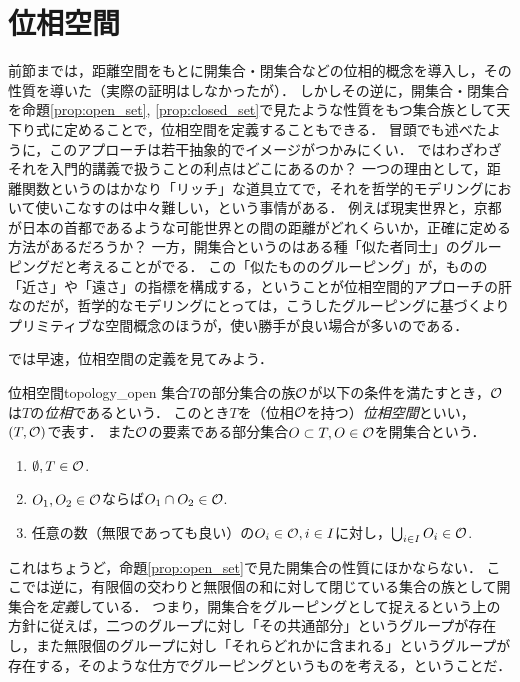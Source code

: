 \documentclass[11pt,a4paper, dvipdfmx]{jsarticle}
\begin{document}



\section{位相空間}

前節までは，距離空間をもとに開集合・閉集合などの位相的概念を導入し，その性質を導いた（実際の証明はしなかったが）．
しかしその逆に，開集合・閉集合を命題\ref{prop:open_set}, \ref{prop:closed_set}で見たような性質をもつ集合族として天下り式に定めることで，位相空間を定義することもできる．
冒頭でも述べたように，このアプローチは若干抽象的でイメージがつかみにくい．
ではわざわざそれを入門的講義で扱うことの利点はどこにあるのか？
一つの理由として，距離関数というのはかなり「リッチ」な道具立てで，それを哲学的モデリングにおいて使いこなすのは中々難しい，という事情がある．
例えば現実世界と，京都が日本の首都であるような可能世界との間の距離がどれくらいか，正確に定める方法があるだろうか？
一方，開集合というのはある種「似た者同士」のグルーピングだと考えることがでる．
この「似たもののグルーピング」が，ものの「近さ」や「遠さ」の指標を構成する，ということが位相空間的アプローチの肝なのだが，哲学的なモデリングにとっては，こうしたグルーピングに基づくよりプリミティブな空間概念のほうが，使い勝手が良い場合が多いのである．

では早速，位相空間の定義を見てみよう．

\begin{dfn}{位相空間}{topology_open}
集合$T$の部分集合の族$\mathcal{O}$が以下の条件を満たすとき，$\mathcal{O}$は$T$の\emph{位相}であるという．
このとき$T$を（位相$\mathcal{O}$を持つ）\emph{位相空間}といい，$(T, \mathcal{O})$で表す．
また$\mathcal{O}$の要素である部分集合$O \subset T, O \in \mathcal{O}$を開集合という．
\begin{enumerate}
 \item $\emptyset, T \in \mathcal{O}$.
 \item $O_1, O_2 \in \mathcal{O}$ならば$O_1 \cap O_2 \in \mathcal{O}$.
 \item 任意の数（無限であっても良い）の$O_i \in \mathcal{O}, i \in I$に対し，$\bigcup_{i \in I} O_i \in \mathcal{O}$.
\end{enumerate}
\end{dfn}

これはちょうど，命題\ref{prop:open_set}で見た開集合の性質にほかならない．
ここでは逆に，有限個の交わりと無限個の和に対して閉じている集合の族として開集合を\emph{定義}している．
つまり，開集合をグルーピングとして捉えるという上の方針に従えば，二つのグループに対し「その共通部分」というグループが存在し，また無限個のグループに対し「それらどれかに含まれる」というグループが存在する，そのような仕方でグルーピングというものを考える，ということだ．
\end{document}
